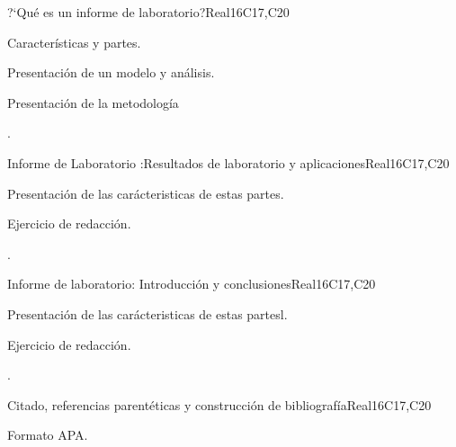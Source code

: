 \begin{syllabus}
\begin{unit}{?`Qué es un informe de laboratorio?}{}{Real}{16}{C17,C20}
  \begin{topics}
      \item Características y partes.
      \item Presentación de un modelo y análisis.
      \item Presentación de la metodología 
  \end{topics}

  \begin{learningoutcomes}
   \item .%
  \end{learningoutcomes}
\end{unit}

\begin{unit}{Informe de Laboratorio :Resultados de laboratorio y aplicaciones}{}{Real}{16}{C17,C20}
  \begin{topics}
      \item Presentación de las carácteristicas de estas partes.
      \item Ejercicio de redacción.
  \end{topics}

  \begin{learningoutcomes}
   \item .%
  \end{learningoutcomes}
\end{unit}

\begin{unit}{Informe de laboratorio: Introducción y conclusiones}{}{Real}{16}{C17,C20}
  \begin{topics}
      \item Presentación de las carácteristicas de estas partesl.
      \item Ejercicio de redacción.
  \end{topics}

  \begin{learningoutcomes}
   \item .%
  \end{learningoutcomes}
\end{unit}

\begin{unit}{Citado, referencias parentéticas y construcción de bibliografía}{}{Real}{16}{C17,C20}
  \begin{topics}
      \item Formato APA.
  \end{topics}


\end{unit}
\end{syllabus}
